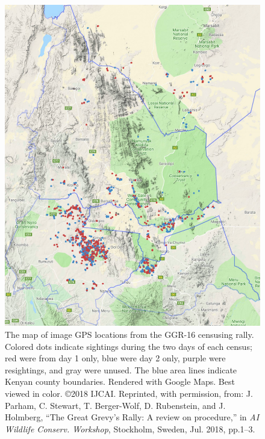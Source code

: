 \begin{figure}[!t]
    \begin{center}
        \includegraphics[width=0.83\linewidth]{resources/ggr2016.pdf}
    \end{center}
    \caption{The map of image GPS locations from the GGR-16 censusing rally.  Colored dots indicate sightings during the two days of each census; red were from day 1 only, blue were day 2 only, purple were resightings, and gray were unused.  The blue area lines indicate Kenyan county boundaries.  Rendered with Google Maps. Best viewed in color.  \copyright 2018 IJCAI. Reprinted, with permission, from: J. Parham, C. Stewart, T. Berger-Wolf, D. Rubenstein, and J. Holmberg, ``The Great Grevy’s Rally: A review on procedure,'' in \textit{AI Wildlife Conserv. Workshop}, Stockholm, Sweden, Jul. 2018, pp.1–3.}
    \label{fig:maps-ggr16}
\end{figure}

